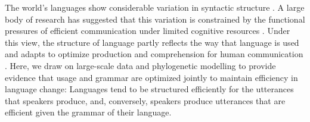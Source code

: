 \documentclass[11pt,a4paper]{article}
\begin{document}



The world's languages show considerable variation in syntactic structure \citep{greenberg-universals-1963, baker2001atoms, croft2003typology}.
A large body of research has suggested that this variation is constrained by the functional pressures of efficient communication under limited cognitive resources \citep{haspelmath2008parametric, jaeger2011on, kemp2018semantic, gibson2019how}.
Under this view, the structure of language partly reflects the way that language is used \citep{hopper1984the, bybee1994the, croft2000explaining, bybee2006from} and adapts to optimize  production and comprehension for human communication \citep{hawkins-performance-1994, haspelmath2006against, bybee2010language}.
Here, we draw on large-scale data and phylogenetic modelling to provide evidence that usage and grammar are optimized jointly to maintain efficiency in language change:
Languages tend to be structured efficiently for the utterances that speakers produce, and, conversely, speakers produce utterances that are efficient given the grammar of their language.
\end{document}
